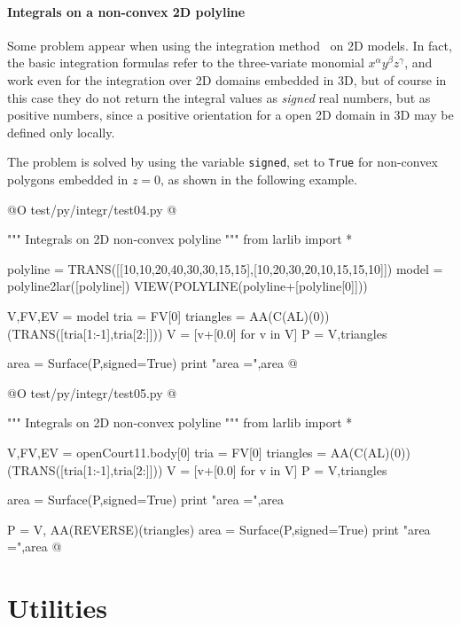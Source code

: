 \documentclass[11pt,oneside]{article}	%
\begin{document}
\paragraph{Integrals on a non-convex 2D polyline}

Some problem appear when using the integration method~\cite{CattaniP-BIL1990} on 2D models.
In fact, the basic integration formulas refer to the three-variate monomial $x^\alpha y^\beta z^\gamma$, 
and work even for the integration over 2D domains embedded in 3D, but of course in this case they do not return
the integral values as \emph{signed} real numbers, but as positive numbers, since a positive orientation for a open 2D domain in 3D may be defined only locally.

The problem is solved by using the variable \texttt{signed}, set to \texttt{True} for non-convex polygons embedded in $z=0$,
as shown in the following example.

@O test/py/integr/test04.py
@{""" Integrals on 2D non-convex polyline """
from larlib import *

polyline = TRANS([[10,10,20,40,30,30,15,15],[10,20,30,20,10,15,15,10]])
model = polyline2lar([polyline])
VIEW(POLYLINE(polyline+[polyline[0]]))

V,FV,EV = model
tria = FV[0]
triangles = AA(C(AL)(0))(TRANS([tria[1:-1],tria[2:]]))
V = [v+[0.0] for v in V]
P = V,triangles

area = Surface(P,signed=True)
print "area =",area
@}


@O test/py/integr/test05.py
@{""" Integrals on 2D non-convex polyline """
from larlib import *

V,FV,EV = openCourt11.body[0]
tria = FV[0]
triangles = AA(C(AL)(0))(TRANS([tria[1:-1],tria[2:]]))
V = [v+[0.0] for v in V]
P = V,triangles

area = Surface(P,signed=True)
print "area =",area

P = V, AA(REVERSE)(triangles)
area = Surface(P,signed=True)
print "area =",area
@}

   

\appendix
\section{Utilities}





\end{document}
